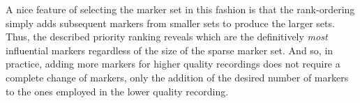 A nice feature of selecting the marker set in this fashion is that the rank-ordering
simply adds subsequent markers from smaller sets to produce the larger sets.  Thus, the described 
priority ranking reveals which are the definitively \emph{most} influential markers regardless of the
size of the sparse marker set. And so, in practice, adding more
markers for higher quality recordings does not require a complete change of markers, only the
addition of the desired number of markers to the ones employed in the lower quality recording.








